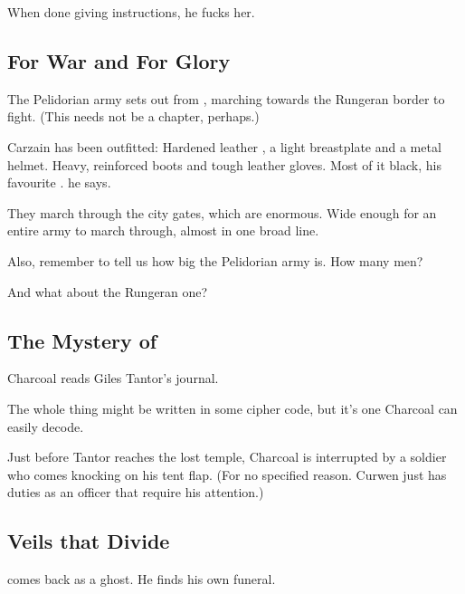 When done giving instructions, he fucks her. 









\subsection{For War and For Glory}
The Pelidorian army sets out from \Malcur, marching towards the Rungeran border to fight. (This needs not be a chapter, perhaps.) 

Carzain has been outfitted: Hardened leather \armour, a light breastplate and a metal helmet. Heavy, reinforced boots and tough leather gloves. Most of it black, his favourite \colour.  he says.

They march through the \Malcuric{} city gates, which are enormous. Wide enough for an entire army to march through, almost in one broad line. 

Also, remember to tell us how big the Pelidorian army is. How many men?

And what about the Rungeran one?













\subsection{The Mystery of \EreshKal}
Charcoal reads Giles Tantor's journal. 

The whole thing might be written in some cipher code, but it's one Charcoal can easily decode. 

Just before Tantor reaches the lost temple, Charcoal is interrupted by a soldier who comes knocking on his tent flap. (For no specified reason. Curwen just has duties as an officer that require his attention.)







\subsection{Veils that Divide} 
\Icor{} comes back as a ghost. 
He finds his own funeral. 

